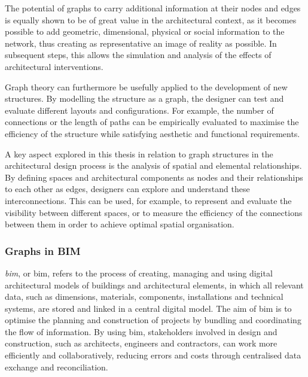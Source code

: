\documentclass[a4paper, 12pt]{report}
\begin{document}
The potential of graphs to carry additional information at their nodes and edges is equally shown to be of great value in the architectural context, as it becomes possible to add geometric, dimensional, physical or social information to the network, thus creating as representative an image of reality as possible. In subsequent steps, this allows the simulation and analysis of the effects of architectural interventions.

Graph theory can furthermore be usefully applied to the development of new structures. By modelling the structure as a graph, the designer can test and evaluate different layouts and configurations. For example, the number of connections or the length of paths can be empirically evaluated to maximise the efficiency of the structure while satisfying aesthetic and functional requirements.

A key aspect explored in this thesis in relation to graph structures in the architectural design process is the analysis of spatial and elemental relationships. By defining spaces and architectural components as nodes and their relationships to each other as edges, designers can explore and understand these interconnections. This can be used, for example, to represent and evaluate the visibility between different spaces, or to measure the efficiency of the connections between them in order to achieve optimal spatial organisation.

\subsubsection{Graphs in BIM}\label{subsec:graphs-in-bim}

\textit{\acrlong{bim}}, or \acrshort{bim}, refers to the process of creating, managing and using digital architectural models of buildings and architectural elements, in which all relevant data, such as dimensions, materials, components, installations and technical systems, are stored and linked in a central digital model. The aim of \acrshort{bim} is to optimise the planning and construction of projects by bundling and coordinating the flow of information. By using \acrshort{bim}, stakeholders involved in design and construction, such as architects, engineers and contractors, can work more efficiently and collaboratively, reducing errors and costs through centralised data exchange and reconciliation.
\end{document}
